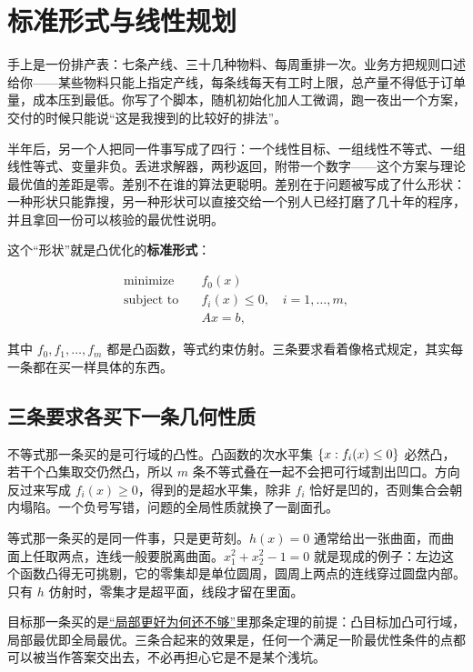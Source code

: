 \section{标准形式与线性规划}
\label{sec:09-Convex-Optimization/04-Convex-Problems/01}

手上是一份排产表：七条产线、三十几种物料、每周重排一次。业务方把规则口述给你——某些物料只能上指定产线，每条线每天有工时上限，总产量不得低于订单量，成本压到最低。你写了个脚本，随机初始化加人工微调，跑一夜出一个方案，交付的时候只能说``这是我搜到的比较好的排法''。

半年后，另一个人把同一件事写成了四行：一个线性目标、一组线性不等式、一组线性等式、变量非负。丢进求解器，两秒返回，附带一个数字——这个方案与理论最优值的差距是零。差别不在谁的算法更聪明。差别在于问题被写成了什么形状：一种形状只能靠搜，另一种形状可以直接交给一个别人已经打磨了几十年的程序，并且拿回一份可以核验的最优性说明。

这个``形状''就是凸优化的\textbf{标准形式}：

\[
\begin{aligned}
\text{minimize}\quad &f_0(x)\\
\text{subject to}\quad
&f_i(x)\le0,\quad i=1,\ldots,m,\\
&Ax=b,
\end{aligned}
\]

其中 \(f_0,f_1,\ldots,f_m\) 都是凸函数，等式约束仿射。三条要求看着像格式规定，其实每一条都在买一样具体的东西。

\subsection{三条要求各买下一条几何性质}

不等式那一条买的是可行域的凸性。凸函数的次水平集 \(\left\{x:f_i(x)\le0\right\}\) 必然凸，若干个凸集取交仍然凸，所以 \(m\) 条不等式叠在一起不会把可行域割出凹口。方向反过来写成 \(f_i(x)\ge0\)，得到的是超水平集，除非 \(f_i\) 恰好是凹的，否则集合会朝内塌陷。一个负号写错，问题的全局性质就换了一副面孔。

等式那一条买的是同一件事，只是更苛刻。\(h(x)=0\) 通常给出一张曲面，而曲面上任取两点，连线一般要脱离曲面。\(x_1^2+x_2^2-1=0\) 就是现成的例子：左边这个函数凸得无可挑剔，它的零集却是单位圆周，圆周上两点的连线穿过圆盘内部。只有 \(h\) 仿射时，零集才是超平面，线段才留在里面。

目标那一条买的是\hyperref[sec:09-Convex-Optimization/01-Optimization-Foundations/02]{``局部更好为何还不够''}里那条定理的前提：凸目标加凸可行域，局部最优即全局最优。三条合起来的效果是，任何一个满足一阶最优性条件的点都可以被当作答案交出去，不必再担心它是不是某个浅坑。

